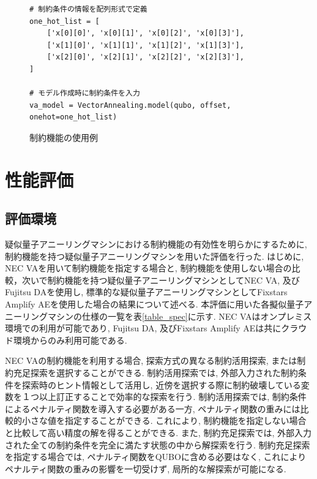 \documentclass[submit,techrep,noauthor]{ipsj}
\newcounter{sourcecodefigure}
\newcounter{normalfigure}
\newcommand{\switchtosourcecode}{%
    \setcounter{normalfigure}{\value{figure}}
    \setcounter{figure}{\value{sourcecodefigure}}
}
\newcommand{\switchtonormal}{%
    \setcounter{sourcecodefigure}{\value{figure}}
    \setcounter{figure}{\value{normalfigure}}
}
\newcommand\sourcecodeposition{h}
\newenvironment{sourcecode}[1][h]{%
    \begin{figure}[#1]
    \renewcommand\sourcecodeposition{#1}
    \centering
    \captionsetup{name=ソースコード}
    \switchtosourcecode
    \ifthenelse{\equal{\sourcecodeposition}{t}}%
        {\vspace{-1.3zh}} %
        {\ifthenelse{\equal{\sourcecodeposition}{b}}%
            {\vspace{-2zh}} %
            {\vspace{-2zh}} %
    }
}{%
    \ifthenelse{\equal{\sourcecodeposition}{t}}%
        {\vspace{-1.3zh}} %
        {\ifthenelse{\equal{\sourcecodeposition}{b}}%
            {\vspace{-1zh}} %
            {\vspace{-3zh}} %
    }
    \switchtonormal
    \end{figure}
}
\begin{document}
\begin{sourcecode}[tb] %
\caption{制約機能の使用例}\label{code:nec_va}
\begin{lstlisting}
# 制約条件の情報を配列形式で定義
one_hot_list = [
    ['x[0][0]', 'x[0][1]', 'x[0][2]', 'x[0][3]'],
    ['x[1][0]', 'x[1][1]', 'x[1][2]', 'x[1][3]'],
    ['x[2][0]', 'x[2][1]', 'x[2][2]', 'x[2][3]'],
]

# モデル作成時に制約条件を入力
va_model = VectorAnnealing.model(qubo, offset, onehot=one_hot_list)
\end{lstlisting}
\vspace{3mm}
\end{sourcecode}

\section{性能評価}

\subsection{評価環境}
疑似量子アニーリングマシンにおける制約機能の有効性を明らかにするために, 制約機能を持つ疑似量子アニーリングマシンを用いた評価を行った. はじめに, NEC VAを用いて制約機能を指定する場合と, 制約機能を使用しない場合の比較，次いで制約機能を持つ疑似量子アニーリングマシンとしてNEC VA, 及びFujitsu DAを使用し, 標準的な疑似量子アニーリングマシンとしてFixstars Amplify AEを使用した場合の結果について述べる. 本評価に用いた各擬似量子アニーリングマシンの仕様の一覧を表\ref{table_spec}に示す. NEC VAはオンプレミス環境での利用が可能であり, Fujitsu DA, 及びFixstars Amplify AEは共にクラウ
ド環境からのみ利用可能である.

NEC VAの制約機能を利用する場合, 探索方式の異なる制約活用探索, または制約充足探索を選択することができる. 制約活用探索では, 外部入力された制約条件を探索時のヒント情報として活用し, 近傍を選択する際に制約破壊している変数を１つ以上訂正することで効率的な探索を行う. 制約活用探索では, 制約条件によるペナルティ関数を導入する必要がある一方, ペナルティ関数の重みには比較的小さな値を指定することができる. これにより, 制約機能を指定しない場合と比較して高い精度の解を得ることができる. また, 制約充足探索では, 外部入力された全ての制約条件を完全に満たす状態の中から解探索を行う. 制約充足探索を指定する場合では, ペナルティ関数をQUBOに含める必要はなく, これによりペナルティ関数の重みの影響を一切受けず, 局所的な解探索が可能になる.
\end{document}

